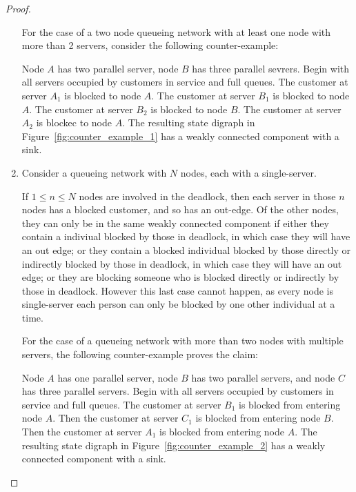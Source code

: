 \documentclass{article}
\numberwithin{equation}{section}
\begin{document}
\begin{proof}
\begin{enumerate}
For the case of a two node queueing network with at least one node with more than 2 servers, consider the following counter-example:

Node $A$ has two parallel server, node $B$ has three parallel sevrers.
Begin with all servers occupied by customers in service and full queues.
The customer at server $A_1$ is blocked to node $A$.
The customer at server $B_1$ is blocked to node $A$.
The customer at server $B_2$ is blocked to node $B$.
The customer at server $A_2$ is blockec to node $A$.
The resulting state digraph in Figure~\ref{fig:counter_example_1} has a weakly connected component with a sink.

\item
Consider a queueing network with $N$ nodes, each with a single-server.

If $1 \leq n \leq N$ nodes are involved in the deadlock, then each server in those $n$ nodes has a blocked customer, and so has an out-edge.
Of the other nodes, they can only be in the same weakly connected component if either they contain a indiviual blocked by those in deadlock, in which case they will have an out edge; or they contain a blocked individual blocked by those directly or indirectly blocked by those in deadlock, in which case they will have an out edge; or they are blocking someone who is blocked directly or indirectly by those in deadlock.
However this last case cannot happen, as every node is single-server each person can only be blocked by one other individual at a time.

For the case of a queueing network with more than two nodes with multiple servers, the following counter-example proves the claim:

Node $A$ has one parallel server, node $B$ has two parallel servers, and node $C$ has three parallel servers.
Begin with all servers occupied by customers in service and full queues.
The customer at server $B_1$ is blocked from entering node $A$.
Then the customer at server $C_1$ is blocked from entering node $B$.
Then the customer at server $A_1$ is blocked from entering node $A$.
The resulting state digraph in Figure~\ref{fig:counter_example_2} has a weakly connected component with a sink.
\end{enumerate}
\end{proof}
\end{document}
